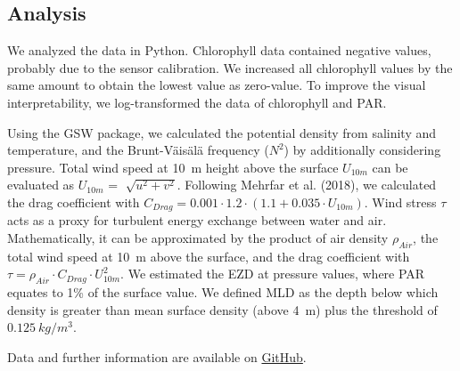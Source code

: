 \documentclass[../Main.tex]{subfiles}
\begin{document}
\subsection*{\crule[blue]{.2cm}{.2cm} Analysis}
We analyzed the data in Python.
Chlorophyll data contained negative values, probably due to the sensor calibration.
We increased all chlorophyll values by the same amount to obtain the lowest value as zero-value.
To improve the visual interpretability, we log-transformed the data of chlorophyll and PAR.

Using the GSW package, we calculated the potential density from salinity and temperature, and the Brunt-Väisälä frequency ($N^2$) by additionally considering pressure.\supercite{gsw} 
Total wind speed at \SI{10}{m} height above the surface $U_{10m}$ can be evaluated as $U_{10m}$ = $\sqrt[]{u^2 + v^2}$. 
Following Mehrfar et al. (2018), we calculated the drag coefficient with $C_{Drag} = 0.001\cdot1.2\cdot  (1.1+0.035\cdot U_{10m})$. 
Wind stress $\tau$ acts as a proxy for turbulent energy exchange between water and air.
Mathematically, it can be approximated by the product of air density $\rho_{Air}$, the total wind speed at \SI{10}{m} above the surface, and the drag coefficient with $\tau = \rho_{Air}\cdot C_{Drag}\cdot U_{10m}^2$.\supercite{Mehrfar2018}
We estimated the EZD at pressure values, where PAR equates to 1\% of the surface value.\supercite{Lee2007}
We defined MLD as the depth below which density is greater than mean surface density (above \SI{4}{m}) plus the threshold of $\SI{0.125}{kg/m^3}$.

Data and further information are available on \href{https://github.com/joaldi2208/BloomDynamics}{GitHub}.
\end{document}
